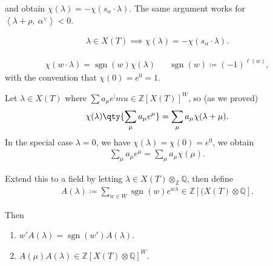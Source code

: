 and obtain \(\chi(\lambda) = -\chi(s_\alpha \cdot \lambda)\). The same
argument works for
\({\left\langle {\lambda + \rho},~{\alpha^\vee} \right\rangle} < 0\).

\begin{remark}

\begin{align*}  
\lambda \in X(T) \implies \chi(\lambda) = -\chi(s_\alpha \cdot \lambda)
.\end{align*}

\end{remark}

\begin{proposition}

\begin{align*}  
\chi(w\cdot \lambda) = \operatorname{sgn}(w) \chi(\lambda) && \operatorname{sgn}(w) \coloneqq(-1)^{\ell(w)}
,\end{align*}
with the convention that \(\chi(0) = e^0 = 1\).

\end{proposition}

\begin{lemma}[?]

Let \(\lambda \in X(T)\) where
\(\sum a_\mu e^|mu \in {\mathbb{Z}}[X(T)]^W\), so (as we proved)
\begin{align*}  
\chi(\lambda) \qty{ \sum_\mu a_\mu e^\mu } = \sum_\mu a_\mu \chi(\lambda + \mu)
.\end{align*}
In the special case \(\lambda = 0\), we have
\(\chi(\lambda) = \chi(0) = e^0\), we obtain
\begin{align*}  
\sum_\mu a_\mu e^\mu = \sum_\mu a_\mu \chi(\mu)
.\end{align*}

Extend this to a field by letting
\(\lambda \in X(T) \otimes_{\mathbb{Z}}{\mathbb{Q}}\), then define
\begin{align*}  
A(\lambda) \coloneqq\sum_{w\in W} \operatorname{sgn}(w) e^{w \lambda} \in {\mathbb{Z}}[ (X(T) \otimes{\mathbb{Q}}]
.\end{align*}

Then

\begin{enumerate}
\def\labelenumi{\arabic{enumi}.}
\item
  \(w' A(\lambda) = \operatorname{sgn}(w') A(\lambda)\).
\item
  \(A(\mu) A(\lambda) \in {\mathbb{Z}}[X(T) \otimes{\mathbb{Q}}]^W\).
\end{enumerate}

\end{lemma}

